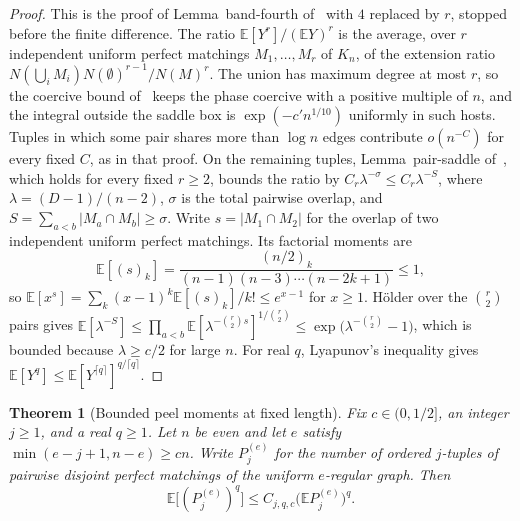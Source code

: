 \documentclass[11pt]{article}
\newtheorem{theorem}{Theorem}
\newcommand{\EE}{\mathbb{E}}
\begin{document}
\begin{proof}
This is the proof of Lemma~band-fourth of~\cite{PlusOneV1} with \(4\)
replaced by \(r\), stopped before the finite difference.
The ratio \(\EE[Y^r]/(\EE Y)^r\) is the average, over \(r\) independent
uniform perfect matchings \(M_1,\ldots,M_r\) of \(K_n\), of the extension ratio
\(N(\bigcup_i M_i)N(\emptyset)^{r-1}/N(M)^r\).
The union has maximum degree at most \(r\), so the coercive bound
of~\cite{PlusOneV1} keeps the phase coercive with a positive multiple of
\(n\), and the integral outside the saddle box is \(\exp(-c'n^{1/10})\)
uniformly in such hosts.
Tuples in which some pair shares more than \(\log n\) edges contribute
\(o(n^{-C})\) for every fixed \(C\), as in that proof.
On the remaining tuples, Lemma~pair-saddle of~\cite{PlusOneV1}, which holds
for every fixed \(r\ge2\), bounds the ratio by
\(C_r\lambda^{-\sigma}\le C_r\lambda^{-S}\), where \(\lambda=(D-1)/(n-2)\),
\(\sigma\) is the total pairwise overlap, and
\(S=\sum_{a<b}|M_a\cap M_b|\ge\sigma\).
Write \(s=|M_1\cap M_2|\) for the overlap of two independent uniform perfect
matchings. Its factorial moments are
\[
\EE[(s)_k]=\frac{(n/2)_k}{(n-1)(n-3)\cdots(n-2k+1)}\le1,
\]
so \(\EE[x^{s}]=\sum_k(x-1)^k\EE[(s)_k]/k!\le e^{x-1}\) for \(x\ge1\).
Hölder over the \(\binom r2\) pairs gives
\(\EE[\lambda^{-S}]\le\prod_{a<b}\EE[\lambda^{-\binom r2 s}]^{1/\binom r2}
\le\exp\bigl(\lambda^{-\binom r2}-1\bigr)\),
which is bounded because \(\lambda\ge c/2\) for large \(n\).
For real \(q\), Lyapunov's inequality gives
\(\EE[Y^q]\le\EE[Y^{\lceil q\rceil}]^{q/\lceil q\rceil}\).
\end{proof}

\begin{theorem}[Bounded peel moments at fixed length]
\label{thm:peel-moments}
Fix \(c\in(0,1/2]\), an integer \(j\ge1\), and a real \(q\ge1\).
Let \(n\) be even and let \(e\) satisfy \(\min(e-j+1,n-e)\ge cn\).
Write \(P_j^{(e)}\) for the number of ordered \(j\)-tuples of pairwise disjoint
perfect matchings of the uniform \(e\)-regular graph. Then
\[
\EE\bigl[(P_j^{(e)})^q\bigr]\le C_{j,q,c}\bigl(\EE P_j^{(e)}\bigr)^q .
\]
\end{theorem}
\end{document}
